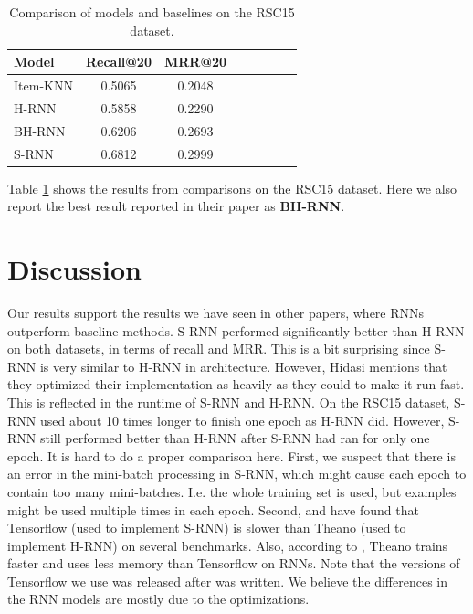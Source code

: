 




\begin{table}
	\centering
	\begin{tabular}{l*{6}{c}r}
		Model			& Recall@20	& MRR@20 \\
		\hline
		Item-KNN		& 0.5065	& 0.2048 \\
		H-RNN			& 0.5858	& 0.2290 \\
		BH-RNN			& 0.6206	& 0.2693 \\
		S-RNN			& 0.6812	& 0.2999 \\
	\end{tabular}
	\caption{Comparison of models and baselines on the RSC15 dataset.}
	\label{table:rsc15-comp}
\end{table}

Table \ref{table:rsc15-comp} shows the results from comparisons on the RSC15 dataset. Here we also report the best result reported in their paper as \textbf{BH-RNN}.






\section{Discussion}
Our results support the results we have seen in other papers, where RNNs outperform baseline methods. S-RNN performed significantly better than H-RNN on both datasets, in terms of recall and MRR. This is a bit surprising since S-RNN is very similar to H-RNN in architecture. However, Hidasi \cite{email:Hidasi} mentions that they optimized their implementation as heavily as they could to make it run fast. This is reflected in the runtime of S-RNN and H-RNN. On the RSC15 dataset, S-RNN used about 10 times longer to finish one epoch as H-RNN did. However, S-RNN still performed better than H-RNN after S-RNN had ran for only one epoch. It is hard to do a proper comparison here. First, we suspect that there is an error in the mini-batch processing in S-RNN, which might cause each epoch to contain too many mini-batches. I.e. the whole training set is used, but examples might be used multiple times in each epoch. Second, \cite{DBLP:journals/corr/BahrampourRSS15} and \cite{glample-rnn-benchmarks} have found that Tensorflow (used to implement S-RNN) is slower than Theano (used to implement H-RNN) on several benchmarks. Also, according to \cite{kuster-good-bad-ugly}, Theano trains faster and uses less memory than Tensorflow on RNNs. Note that the versions of Tensorflow we use was released after \cite{kuster-good-bad-ugly} was written. We believe the differences in the RNN models are mostly due to the optimizations.

